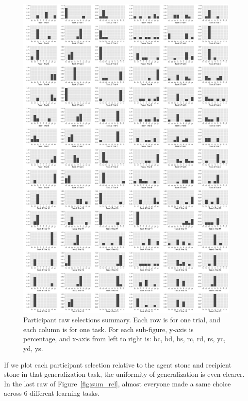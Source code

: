 \documentclass{article}
\begin{document}
\begin{figure}[h!]
  \centering
  \includegraphics[width=.8\linewidth]{trials}
  \caption{Participant raw selections summary. Each row is for one trial, and each column is for one task. For each sub-figure, y-axis is percentage, and x-axis from left to right is: bc, bd, bs, rc, rd, rs, yc, yd, ys.}
  \label{fig:sum}
\end{figure}

\newpage
If we plot each participant selection relative to the agent stone and recipient stone in that generalization task, the uniformity of generalization is even clearer. In the last raw of Figure~\ref{fig:sum_rel}, almost everyone made a same choice across 6 different learning tasks. 
\end{document}
